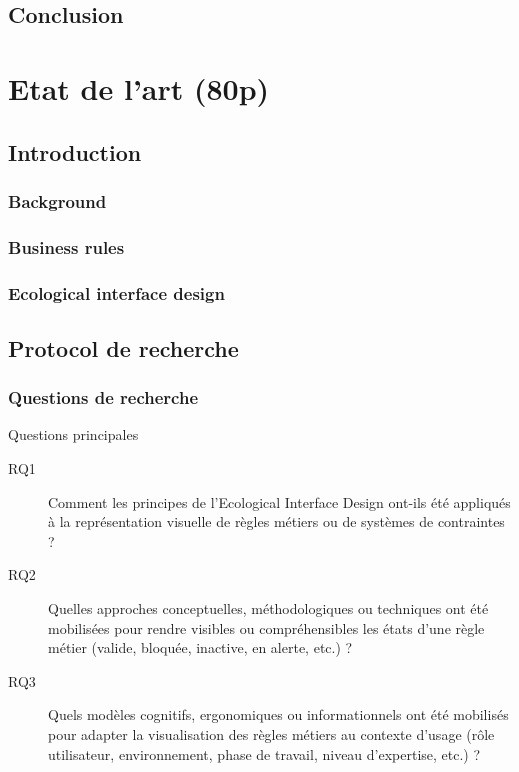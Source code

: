 \documentclass[a4paper,12pt]{article}
\begin{document}
\subsection{Conclusion}
\label{sec:org4d7eed3}
\clearpage
\section{Etat de l'art (80p)}
\label{sec:org5999d23}
\subsection{Introduction}
\label{sec:orgc8ad11a}

\subsubsection{Background}
\label{sec:org2f5715c}
\subsubsection{Business rules}
\label{sec:org427a71d}

\subsubsection{Ecological interface design}
\label{sec:org4e43ea5}
\subsection{Protocol de recherche}
\label{sec:org3ea09d4}
\subsubsection{Questions de recherche}
\label{sec:orgac27853}
Questions principales
\begin{description}
\item[{\label{orga6d67e2}RQ1}] Comment les principes de l’Ecological Interface Design ont-ils été appliqués à la représentation visuelle de règles métiers ou de systèmes de contraintes ?
\item[{\label{org6b49f3a}RQ2}] Quelles approches conceptuelles, méthodologiques ou techniques ont été mobilisées pour rendre visibles ou compréhensibles les états d’une règle métier (valide, bloquée, inactive, en alerte, etc.) ?
\item[{\label{org133b723}RQ3}] Quels modèles cognitifs, ergonomiques ou informationnels ont été mobilisés pour adapter la visualisation des règles métiers au contexte d’usage (rôle utilisateur, environnement, phase de travail, niveau d’expertise, etc.) ?
\end{description}
\end{document}

